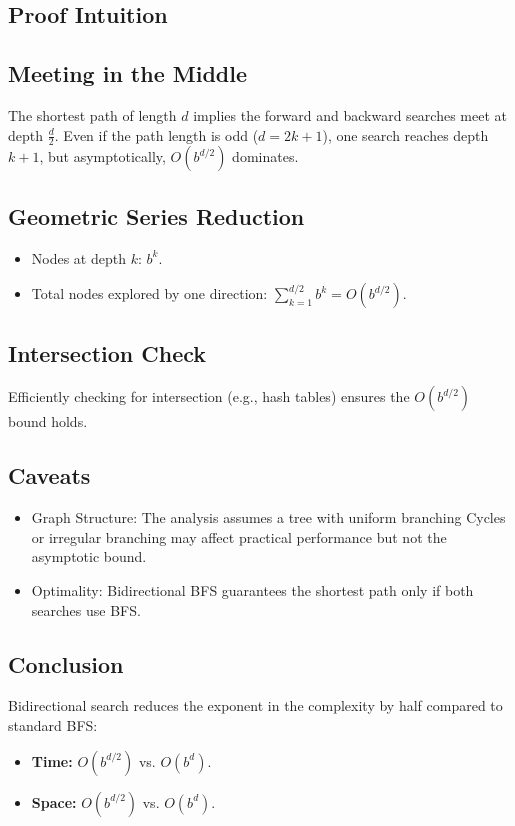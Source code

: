 \begin{appendices}
\section*{Proof Intuition}
\subsection*{Meeting in the Middle}
The shortest path of length $d$ implies the forward and backward searches meet at depth $\frac{d}{2}$.  
Even if the path length is odd ($d = 2k + 1$), one search reaches depth $k + 1$, but asymptotically, $O(b^{d/2})$ dominates.

\subsection*{Geometric Series Reduction}
\begin{itemize}
	\item Nodes at depth $k$: $b^k$.
	\item Total nodes explored by one direction: $\sum_{k=1}^{d/2} b^k = O(b^{d/2})$.
\end{itemize}

\subsection*{Intersection Check}
Efficiently checking for intersection (e.g., hash tables) ensures the $O(b^{d/2})$ bound holds.

\subsection{Caveats}
\begin{itemize}
	\item Graph Structure: The analysis assumes a tree with uniform branching Cycles or irregular branching may affect practical performance but not the asymptotic bound.
	\item Optimality: Bidirectional BFS guarantees the shortest path only if both searches use BFS.
\end{itemize}

\subsection*{Conclusion}
Bidirectional search reduces the exponent in the complexity by half compared to standard BFS:
\begin{itemize}
	\item \textbf{Time:} $O(b^{d/2})$ vs. $O(b^d)$.
	\item \textbf{Space:} $O(b^{d/2})$ vs. $O(b^d)$.
\end{itemize}

\end{appendices}

